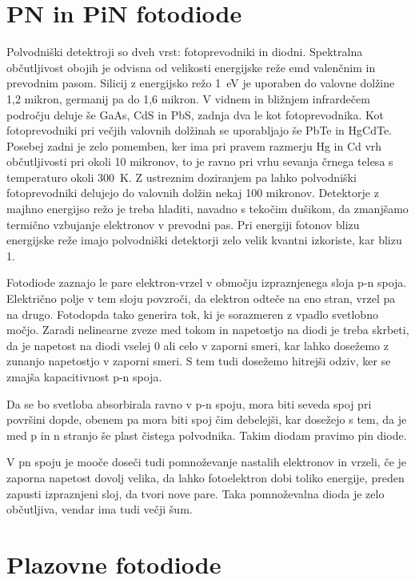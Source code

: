 \section{PN in PiN fotodiode}
Polvodniški detektroji so dveh vrst: fotoprevodniki in diodni. Spektralna občutljivost
obojih je odvisna od velikosti energijske reže emd valenčnim in prevodnim pasom. Silicij
z energijsko režo 1~eV je uporaben do valovne dolžine 1,2 mikron, germanij pa do 1,6 mikron.
V vidnem in bližnjem infrardečem področju deluje še GaAs, CdS in PbS, zadnja dva le kot
fotoprevodnika. Kot fotoprevodniki pri večjih valovnih dolžinah se uporabljajo  še PbTe
in HgCdTe. Posebej zadni je zelo pomemben, ker ima pri pravem razmerju Hg in Cd vrh občutljivosti
pri okoli 10 mikronov, to je ravno pri vrhu sevanja črnega telesa s temperaturo okoli 300~K. 
Z ustreznim doziranjem pa lahko polvodniški fotoprevodniki delujejo do valovnih dolžin nekaj 100 mikronov.
Detektorje  z majhno energijso režo je treba hladiti, navadno s tekočim dušikom, da zmanjšamo
termično vzbujanje elektronov v prevodni pas. Pri energiji fotonov blizu energijske reže 
imajo polvodniški detektorji zelo velik kvantni izkoriste, kar blizu 1.

Fotodiode zaznajo le pare elektron-vrzel v območju izpraznjenega sloja p-n spoja. Električno 
polje v tem sloju povzroči, da elektron odteče na eno stran, vrzel pa na drugo. Fotodopda tako
generira tok, ki je sorazmeren z vpadlo svetlobno močjo. Zaradi nelinearne zveze med tokom in napetostjo
na diodi je treba skrbeti, da je napetost na diodi vselej 0 ali celo v zaporni smeri, kar lahko
dosežemo z zunanjo napetostjo v zaporni smeri. S tem tudi dosežemo hitrejši odziv, ker 
se zmajša kapacitivnost p-n spoja. 

Da se bo svetloba absorbirala ravno v p-n spoju, mora biti seveda spoj pri površini dopde, obenem
pa mora biti spoj čim debelejši, kar dosežejo s tem, da je med  p in n stranjo še plast
čistega polvodnika. Takim diodam pravimo pin diode. 

V pn spoju je mooče doseči tudi pomnoževanje nastalih elektronov in vrzeli, če je zaporna napetost dovolj 
velika, da lahko fotoelektron dobi toliko energije, preden zapusti izpraznjeni sloj, da tvori nove pare.
Taka pomnoževalna dioda je zelo občutljiva, vendar ima tudi večji šum.

\section{Plazovne fotodiode}
 
